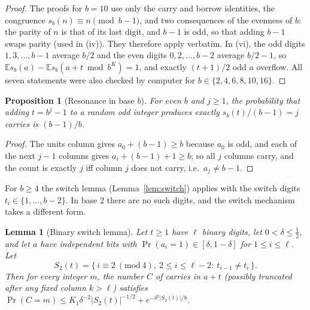 \documentclass[11pt]{article}
\newtheorem{lemma}[theorem]{Lemma}
\newtheorem{proposition}[theorem]{Proposition}
\theoremstyle{definition}
\theoremstyle{remark}
\begin{document}
\begin{proof}
The proofs for $b=10$ use only the carry and borrow identities, the
congruence $s_b(n)\equiv n\pmod{b-1}$, and two consequences of the evenness of
$b$: the parity of $n$ is that of its last digit, and $b-1$ is odd, so that
adding $b-1$ swaps parity (used in (iv)). They therefore apply verbatim. In
(vi), the odd digits $1,3,\dots,b-1$ average $b/2$ and the even digits
$0,2,\dots,b-2$ average $b/2-1$, so $\mathbb Es_b(a)-\mathbb Es_b(a+t\bmod b^K)=1$,
and exactly $(t+1)/2$ odd $a$ overflow. All seven statements were also checked
by computer for $b\in\{2,4,6,8,10,16\}$.
\end{proof}

\begin{proposition}[Resonance in base $b$]\label{prop:resb}
For even $b$ and $j\ge1$, the probability that adding $t=b^j-1$ to a random
odd integer produces exactly $s_b(t)/(b-1)=j$ carries is $(b-1)/b$.
\end{proposition}

\begin{proof}
The units column gives $a_0+(b-1)\ge b$ because $a_0$ is odd, and each of the
next $j-1$ columns gives $a_i+(b-1)+1\ge b$; so all $j$ columns carry, and the
count is exactly $j$ iff column $j$ does not carry, i.e.\ $a_j\neq b-1$.
\end{proof}

For $b\ge4$ the switch lemma (Lemma~\ref{lem:switch}) applies with the
switch digits $t_i\in\{1,\dots,b-2\}$. In base $2$ there are no such digits,
and the switch mechanism takes a different form.

\begin{lemma}[Binary switch lemma]\label{lem:binswitch}
Let $t\ge1$ have $\ell$ binary digits, let $0<\delta\le\frac12$, and let
$a$ have independent bits with $\Pr(a_i=1)\in[\delta,1-\delta]$ for
$1\le i\le\ell$. Let
\[
  S_2(t)=\{\,i\equiv2\ (\mathrm{mod}\ 4),\ 2\le i\le\ell-2:\ t_{i-1}\ne t_i\,\}.
\]
Then for every integer $m$, the number $C$ of carries in $a+t$ (possibly
truncated after any fixed column $k>\ell$) satisfies
$\Pr(C=m)\le K_1\delta^{-2}|S_2(t)|^{-1/2}+e^{-\delta^2|S_2(t)|/8}$.
\end{lemma}
\end{document}
